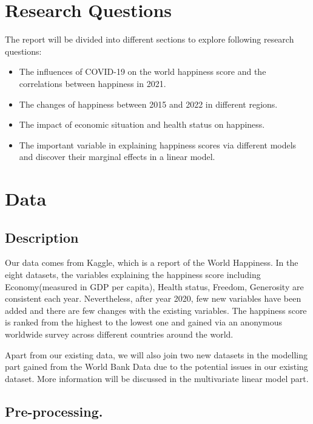 \documentclass[11pt,a4paper,]{article}
\begin{document}
\hypertarget{research-questions}{%
\section{Research Questions}\label{research-questions}}

The report will be divided into different sections to explore following research questions:

\begin{itemize}
\item
  The influences of COVID-19 on the world happiness score and the correlations between happiness in 2021.
\item
  The changes of happiness between 2015 and 2022 in different regions.
\item
  The impact of economic situation and health status on happiness.
\item
  The important variable in explaining happiness scores via different models and discover their marginal effects in a linear model.
\end{itemize}

\hypertarget{data}{%
\section{Data}\label{data}}

\hypertarget{description}{%
\subsection{Description}\label{description}}

Our data comes from Kaggle, which is a report of the World Happiness. In the eight datasets, the variables explaining the happiness score including Economy(measured in GDP per capita), Health status, Freedom, Generosity are consistent each year. Nevertheless, after year 2020, few new variables have been added and there are few changes with the existing variables. The happiness score is ranked from the highest to the lowest one and gained via an anonymous worldwide survey across different countries around the world.

Apart from our existing data, we will also join two new datasets in the modelling part gained from the World Bank Data due to the potential issues in our existing dataset. More information will be discussed in the multivariate linear model part.

\hypertarget{pre-processing.}{%
\subsection{Pre-processing.}\label{pre-processing.}}
\end{document}

